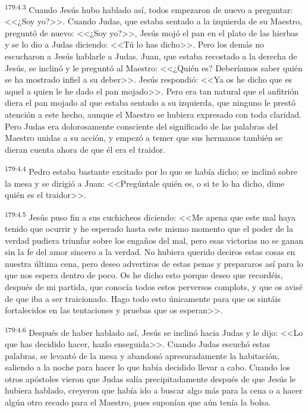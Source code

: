 \par 
\textsuperscript{179:4.3} Cuando Jesús hubo hablado así, todos empezaron de nuevo a preguntar: <<¿Soy yo?>>. Cuando Judas, que estaba sentado a la izquierda de su Maestro, preguntó de nuevo: <<¿Soy yo?>>, Jesús mojó el pan en el plato de las hierbas y se lo dio a Judas diciendo: <<Tú lo has dicho>>. Pero los demás no escucharon a Jesús hablarle a Judas. Juan, que estaba recostado a la derecha de Jesús, se inclinó y le preguntó al Maestro: <<¿Quién es? Deberíamos saber quién se ha mostrado infiel a su deber>>. Jesús respondió: <<Ya os he dicho que es aquel a quien le he dado el pan mojado>>. Pero era tan natural que el anfitrión diera el pan mojado al que estaba sentado a su izquierda, que ninguno le prestó atención a este hecho, aunque el Maestro se hubiera expresado con toda claridad. Pero Judas era dolorosamente consciente del significado de las palabras del Maestro unidas a su acción, y empezó a temer que sus hermanos también se dieran cuenta ahora de que él era el traidor.

\par 
\textsuperscript{179:4.4} Pedro estaba bastante excitado por lo que se había dicho; se inclinó sobre la mesa y se dirigió a Juan: <<Pregúntale quién es, o si te lo ha dicho, dime quién es el traidor>>.

\par 
\textsuperscript{179:4.5} Jesús puso fin a sus cuchicheos diciendo: <<Me apena que este mal haya tenido que ocurrir y he esperado hasta este mismo momento que el poder de la verdad pudiera triunfar sobre los engaños del mal, pero esas victorias no se ganan sin la fe del amor sincero a la verdad. No hubiera querido deciros estas cosas en nuestra última cena, pero deseo advertiros de estas penas y prepararos así para lo que nos espera dentro de poco. Os he dicho esto porque deseo que recordéis, después de mi partida, que conocía todos estos perversos complots, y que os avisé de que iba a ser traicionado. Hago todo esto únicamente para que os sintáis fortalecidos en las tentaciones y pruebas que os esperan>>.

\par 
\textsuperscript{179:4.6} Después de haber hablado así, Jesús se inclinó hacia Judas y le dijo: <<Lo que has decidido hacer, hazlo enseguida>>. Cuando Judas escuchó estas palabras, se levantó de la mesa y abandonó apresuradamente la habitación, saliendo a la noche para hacer lo que había decidido llevar a cabo. Cuando los otros apóstoles vieron que Judas salía precipitadamente después de que Jesús le hubiera hablado, creyeron que había ido a buscar algo más para la cena o a hacer algún otro recado para el Maestro, pues suponían que aún tenía la bolsa.

